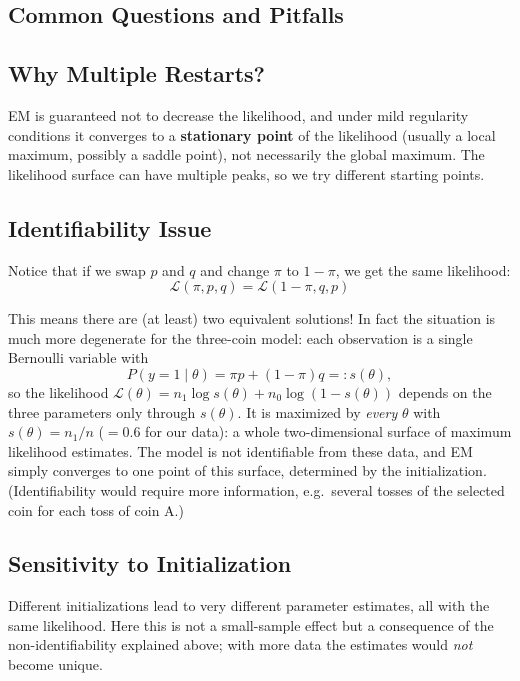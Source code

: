 \begin{notechapter}
\section{Common Questions and Pitfalls}

\subsection{Why Multiple Restarts?}

EM is guaranteed not to decrease the likelihood, and under mild regularity conditions it converges to a \textbf{stationary point} of the likelihood (usually a local maximum, possibly a saddle point), not necessarily the global maximum. The likelihood surface can have multiple peaks, so we try different starting points.

\subsection{Identifiability Issue}

Notice that if we swap $p$ and $q$ and change $\pi$ to $1-\pi$, we get the same likelihood:
\[
\mathcal{L}(\pi, p, q) = \mathcal{L}(1-\pi, q, p)
\]

This means there are (at least) two equivalent solutions! In fact the situation is much more
degenerate for the three-coin model: each observation is a single Bernoulli variable with
\[
P(y = 1 \mid \theta) = \pi p + (1 - \pi) q =: s(\theta),
\]
so the likelihood $\mathcal{L}(\theta) = n_1 \log s(\theta) + n_0 \log(1 - s(\theta))$ depends on the three
parameters only through $s(\theta)$. It is maximized by \emph{every} $\theta$ with $s(\theta) = n_1/n$
($= 0.6$ for our data): a whole two-dimensional surface of maximum likelihood estimates. The model is not
identifiable from these data, and EM simply converges to one point of this surface, determined by the
initialization. (Identifiability would require more information, e.g.\ several tosses of the selected
coin for each toss of coin A.)

\subsection{Sensitivity to Initialization}

Different initializations lead to very different parameter estimates, all with the same likelihood. Here this is not a small-sample effect but a consequence of the non-identifiability explained above; with more data the estimates would \emph{not} become unique.


\end{notechapter}
